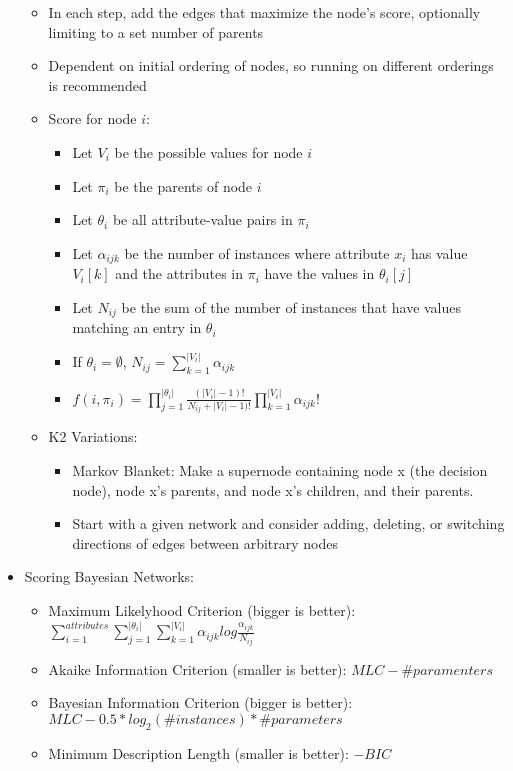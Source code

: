 \documentclass{article}
\begin{document}
\begin{itemize}
\begin{itemize}
			\item In each step, add the edges that maximize the node's score, optionally limiting to a set number of parents
			\item Dependent on initial ordering of nodes, so running on different orderings is recommended
			\item Score for node $i$:
				\begin{itemize}
					\item Let $V_i$ be the possible values for node $i$
					\item Let $\pi_i$ be the parents of node $i$
					\item Let $\theta_i$ be all attribute-value pairs in $\pi_i$
					\item Let $\alpha_{ijk}$ be the number of instances where attribute $x_i$ has value $V_i[k]$ and the attributes in $\pi_i$ have the values in $\theta_i[j]$
					\item Let $N_{ij}$ be the sum of the number of instances that have values matching an entry in $\theta_i$
					\item If $\theta_i = \emptyset$, $N_{ij} = \sum_{k=1}^{|V_i|} \alpha_{ijk}$
					\item $f(i, \pi_i) = \prod_{j=1}^{|\theta_i|} 	\frac{(|V_i| - 1)!}{N_{ij} + |V_i| - 1)!} \prod_{k=1}^{|V_i|} \alpha_{ijk}! $
				\end{itemize}
			\item K2 Variations:
				\begin{itemize}
					\item Markov Blanket: Make a supernode containing node x (the decision node), node x's parents, and node x's children, and their parents.
					\item Start with a given network and consider adding, deleting, or switching directions of edges between arbitrary nodes
				\end{itemize}
		\end{itemize}
	\item Scoring Bayesian Networks:
		\begin{itemize}
			\item Maximum Likelyhood Criterion (bigger is better): $\sum_{i=1}^{attributes}\sum_{j=1}^{|\theta_i|}\sum_{k=1}^{|V_i|} \alpha_{ijk} log \frac{\alpha_{ijk}}{N_ {ij}}$
			\item Akaike Information Criterion (smaller is better): $MLC - \#paramenters$
			\item Bayesian Information Criterion (bigger is better): $MLC - 0.5 * log_2(\#instances) * \#parameters$
			\item Minimum Description Length (smaller is better): $-BIC$
		\end{itemize}
\end{itemize}
\end{document}
